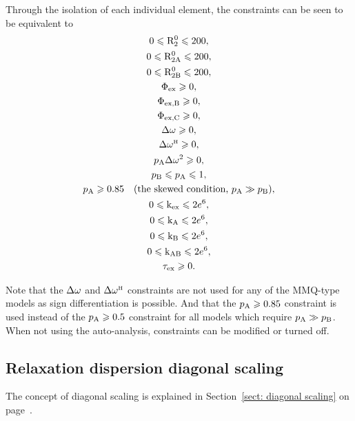\noindent  Through the isolation of each individual element, the constraints can be seen to be equivalent to
\begin{subequations}
\begin{gather} 
    0 \leqslant \mathrm{R}_2^0 \leqslant 200, \\
    0 \leqslant \mathrm{R}_\mathrm{2A}^0 \leqslant 200, \\
    0 \leqslant \mathrm{R}_\mathrm{2B}^0 \leqslant 200, \\
    \Phi_\textrm{ex} \geqslant 0, \\
    \Phi_\textrm{ex,B} \geqslant 0, \\
    \Phi_\textrm{ex,C} \geqslant 0, \\
    \Delta\omega \geqslant 0, \\
    \Delta\omega^{\scriptscriptstyle\mathrm{H}} \geqslant 0, \\
    p_\textrm{A}\Delta\omega^2 \geqslant 0, \\
    p_\textrm{B} \leqslant p_\textrm{A} \leqslant 1, \\
    p_\textrm{A} \geqslant 0.85 \quad (\textrm{the skewed condition, } p_\textrm{A} \gg p_\textrm{B}), \\
    0 \leqslant \textrm{k}_\textrm{ex} \leqslant 2e^6, \\
    0 \leqslant \textrm{k}_\textrm{A} \leqslant 2e^6, \\
    0 \leqslant \textrm{k}_\textrm{B} \leqslant 2e^6, \\
    0 \leqslant \textrm{k}_\textrm{AB} \leqslant 2e^6, \\
    \tau_\textrm{ex} \geqslant 0.
\end{gather} 
\end{subequations}

Note that the $\Delta\omega$ and $\Delta\omega^{\scriptscriptstyle\mathrm{H}}$ constraints are not used for any of the MMQ-type models as sign differentiation is possible.
And that the $p_\textrm{A} \geqslant 0.85$ constraint is used instead of the $p_\textrm{A} \geqslant 0.5$ constraint for all models which require $p_\textrm{A} \gg p_\textrm{B}$.
When not using the auto-analysis, constraints can be modified or turned off.



\subsection{Relaxation dispersion diagonal scaling}

The concept of diagonal scaling is explained in Section~\ref{sect: diagonal scaling} on page~\pageref{sect: diagonal scaling}.

